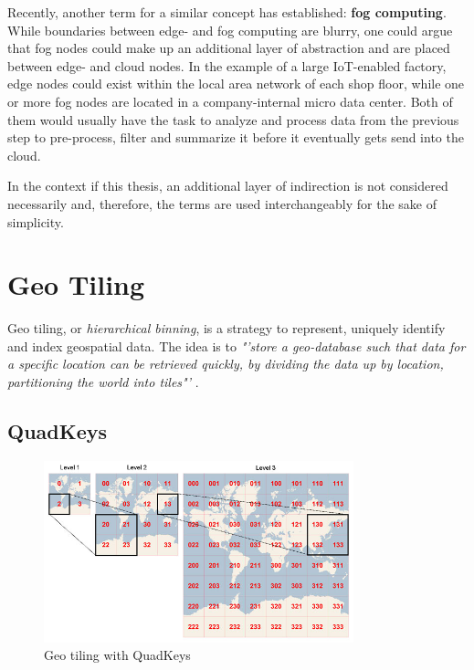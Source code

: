 Recently, another term for a similar concept has established: \textbf{fog computing}. While boundaries between edge- and fog computing are blurry, one could argue that fog nodes could make up an additional layer of abstraction and are placed between edge- and cloud nodes. In the example of a large IoT-enabled factory, edge nodes could exist within the local area network of each shop floor, while one or more fog nodes are located in a company-internal micro data center. Both of them would usually have the task to analyze and process data from the previous step to pre-process, filter and summarize it before it eventually gets send into the cloud.

In the context if this thesis, an additional layer of indirection is not considered necessarily and, therefore, the terms are used interchangeably for the sake of simplicity. 

\section{Geo Tiling}
\label{sec:background:geo_tiling}
Geo tiling, or \textit{hierarchical binning}, is a strategy to represent, uniquely identify and index geospatial data. The idea is to \textit{"'store a geo-database such that data for a specific location can be retrieved quickly, by dividing the data up by location, partitioning the world into tiles"'} \cite{wiki:quadtiles}. 

\subsection{QuadKeys}
\label{subsec:background:quadkeys}

\begin{figure}[H]
	\centering
	\includegraphics[width=0.8\textwidth]{98_images/quadkeys.jpg}
	\caption{Geo tiling with QuadKeys \cite{wiki:quadtiles}}
	\label{fig:quadkeys}
\end{figure}


